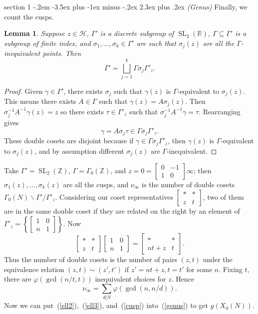 \documentclass[12pt]{article}
\makeatletter
\theoremstyle{norm}
\newtheorem{lem}[thm]{Lemma}
\newcommand{\R}[0]{\mathbb{R}}
\newcommand{\Z}[0]{\mathbb{Z}}
\providecommand{\cal}[1]{\mathcal{#1}}
\renewcommand{\cal}[1]{\mathcal{#1}}
\newcommand{\subeq}[0]{\subseteq}
\newcommand{\ga}[0]{\gamma}
\newcommand{\Ga}[0]{\Gamma}
\newcommand{\ph}[0]{\varphi}
\newcommand{\bc}[1]{\left\{ {#1} \right\}}
\newcommand{\SL}{\operatorname{SL}}
\newcommand{\bs}[0]{\backslash}
\newcommand{\matt}[4]{
\left[
\begin{matrix}
{#1}&{#2}\\
{#3}&{#4}
\end{matrix}
\right]}
\newcommand{\smatt}[4]{
\left[
\begin{smallmatrix}
{#1}&{#2}\\
{#3}&{#4}
\end{smallmatrix}
\right]}
\newenvironment{problem}{\@startsection
       {section}
       {1}
       {-.2em}
       {-3.5ex plus -1ex minus -.2ex}
       {2.3ex plus .2ex}
       {\pagebreak[3]%
       \large\bf\noindent{Problem }
       }
       }
       {%
       }
\makeatother
\begin{document}
\begin{problem}{\it (Genus)}
Finally, we count the cusps.
\begin{lem}
Suppose $z\in \cal H$, $\Ga'$ is a discrete subgroup of $\SL_2(\R)$, $\Ga\subeq \Ga'$ is a subgroup of finite index, and $\sigma_1,\ldots, \sigma_k\in \Ga'$ are such that $\sigma_j(z)$ are all the $\Ga$-inequivalent points. Then
\[
\Ga'=\bigsqcup_{j=1}^k\Ga\sigma_j\Ga'_z.
\]
\end{lem}
\begin{proof}
Given $\ga\in \Ga'$, there exists $\sigma_j$ such that $\ga(z)$ is $\Ga$-equivalent to $\sigma_j(z)$. This means there exists $A\in \Ga$ such that $\ga(z)=A\sigma_j(z)$. Then $\sigma_j^{-1}A^{-1}\ga(z)=z$ so there exists $\tau\in \Ga'_z$ such that $\sigma_j^{-1}A^{-1}\ga=\tau$. Rearranging gives
\[
\ga=A\sigma_j\tau\in \Ga\sigma_j\Ga'_z.
\]
These double cosets are disjoint because if $\ga\in \Ga\sigma_j\Ga'_z$, then $\ga(z)$ is $\Ga$-equivalent to $\sigma_j(z)$, and by assumption different $\sigma_j(z)$ are $\Ga$-inequivalent.
\end{proof}
Take $\Ga'=\SL_2(\Z)$, $\Ga=\Ga_0(\Z)$, and $z=0=\smatt 0{-1}{1}0\infty$; then $\sigma_1(z),\ldots, \sigma_k(z)$ are all the cusps, and $\nu_{\infty}$ is the number of double cosets $\Ga_0(N)\bs \Ga'/\Ga'_z$. Considering our coset representatives $\smatt **zt$, two of them are in the same double coset if they are related on the right by an element of $\Ga'_z=\bc{\smatt 10n1}$. Now
\[
\matt **zt\matt 10n1=\matt **{nt+z}{t}.
\]
Thus the number of double cosets is the number of pairs $(z,t)$ under the equivalence relation $(z,t)\sim (z',t')$ if $z'=nt+z,t=t'$ for some $n$. Fixing $t$, there are $\ph(\gcd(n/t,t))$ inequivalent choices for $z$. Hence
\begin{equation}\label{cusp}
\nu_{\infty}=\sum_{d|N}\ph(\gcd(n,n/d)).
\end{equation}
Now we can put~(\ref{ell2}),~(\ref{ell3}), and~(\ref{cusp}) into~(\ref{genus}) to get $g(X_0(N))$.
\end{problem}
\end{document}
